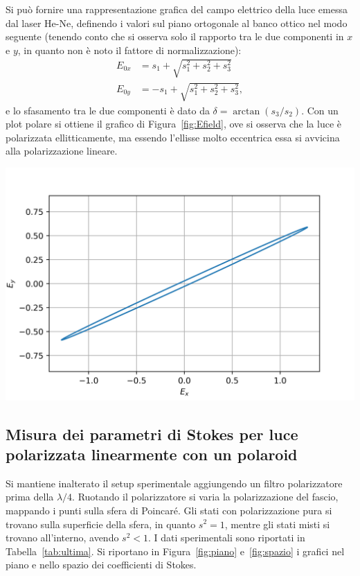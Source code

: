 \documentclass[10pt,oneside,a4paper]{article}
\newenvironment{Figure}
  {\par\medskip\noindent\minipage{\linewidth}}
  {\endminipage\par\medskip}
\begin{document}
\begin{multicols}{2}
Si può fornire una rappresentazione grafica del campo elettrico della luce emessa dal laser He-Ne, definendo i valori sul piano ortogonale al banco ottico nel modo seguente (tenendo conto che si osserva solo il rapporto tra le due componenti in $x$ e $y$, in quanto non è noto il fattore di normalizzazione):
\[
\begin{aligned}
E_{0x} &= s_1 + \sqrt{s_1^2+s_2^2+s_3^2} \\
E_{0y} &= -s_1 + \sqrt{s_1^2+s_2^2+s_3^2},
\end{aligned}
\]
e lo sfasamento tra le due componenti è dato da $\delta = \arctan(s_3/s_2)$. Con un plot polare si ottiene il grafico di Figura~\ref{fig:Efield}, ove si osserva che la luce è polarizzata ellitticamente, ma essendo l'ellisse molto eccentrica essa si avvicina alla polarizzazione lineare. 

\begin{Figure}
	\begin{center}
	\includegraphics[width=\linewidth]{Efield.png}
	\label{fig:Efield}
	\end{center}
\end{Figure}

\subsection{Misura dei parametri di Stokes per luce polarizzata linearmente con un polaroid}
Si mantiene inalterato il setup sperimentale aggiungendo un filtro polarizzatore prima della $\lambda/4$. Ruotando il polarizzatore si varia la polarizzazione del fascio, mappando i punti sulla sfera di Poincaré. Gli stati con polarizzazione pura si trovano sulla superficie della sfera, in quanto $s^2 =1$, mentre gli stati misti si trovano all’interno, avendo $s^2<1$. I dati sperimentali sono riportati in Tabella~\ref{tab:ultima}. Si riportano in Figura~\ref{fig:piano} e~\ref{fig:spazio} i grafici nel piano e nello spazio dei coefficienti di Stokes. 


\end{multicols}
\end{document}
